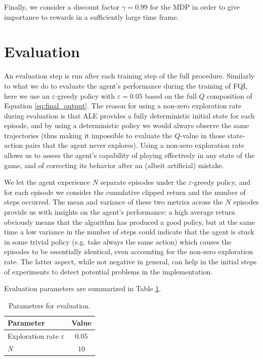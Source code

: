 Finally, we consider a discount factor $\gamma = 0.99$ for the MDP in order to 
give importance to rewards in a sufficiently large time frame. 

\section{Evaluation}
An evaluation step is run after each training step of the full procedure.
Similarly to what we do to evaluate the agent's performance during the training
of FQI, here we use an $\varepsilon$-greedy policy with $\varepsilon = 0.05$ 
based on the full $Q$ composition of Equation \eqref{eq:final_output}.
The reason for using a non-zero exploration rate during evaluation is that ALE
provides a fully deterministic initial state for each episode, and by using a 
deterministic policy we would always observe the same trajectories (thus making
it impossible to evaluate the $Q$-value in those state-action pairs that
the agent never explores). Using a non-zero exploration rate allows us to 
assess the agent's capability of playing effectively in any state of the game, 
and of correcting its behavior after an (albeit artificial) mistake.

We let the agent experience $N$ separate episodes under the $\varepsilon$-greedy 
policy, and for each episode we consider the cumulative clipped return and the
number of steps occurred. The mean and variance of these two metrics across the 
$N$ episodes provide us with insights on the agent's performance: a high average 
return obviously means that the algorithm has produced a good policy, but at the
same time a low variance in the number of steps could indicate that the agent is 
stuck in some trivial policy (e.g. take always the same action) which causes the
episodes to be essentially identical, even accounting for the non-zero 
exploration rate. The latter aspect, while not negative in general, can help in 
the initial steps of experiments to detect potential problems in the 
implementation.

Evaluation parameters are summarized in Table \ref{t:eval}.
%
\begin{table}[h]
    \centering
    \begin{tabular}{l c} 
	\hline
	Parameter                      & Value  \\ 
	\hline 
	Exploration rate $\varepsilon$ & $0.05$ \\
	$N$                            & $10$   \\
	\hline
    \end{tabular}
    \caption[Parameters for evaluation]{Parameters for evaluation.}
    \label{t:eval}
\end{table}
%
